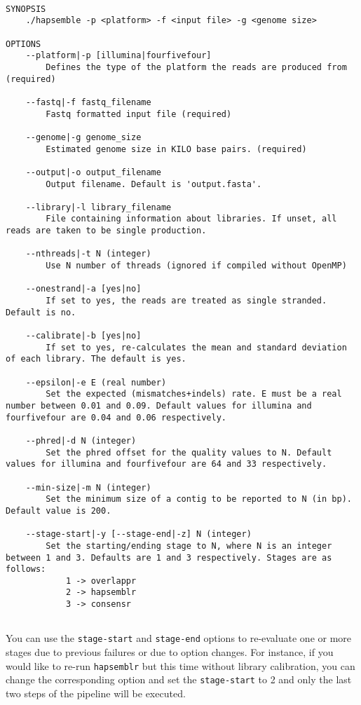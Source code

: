 \documentclass[12pt,a4paper]{report}
\begin{document}
\begin{lstlisting}

SYNOPSIS
    ./hapsemble -p <platform> -f <input file> -g <genome size>

OPTIONS
    --platform|-p [illumina|fourfivefour]
        Defines the type of the platform the reads are produced from (required)
     
    --fastq|-f fastq_filename
        Fastq formatted input file (required)
     
    --genome|-g genome_size
        Estimated genome size in KILO base pairs. (required)
     
    --output|-o output_filename
        Output filename. Default is 'output.fasta'.
     
    --library|-l library_filename
        File containing information about libraries. If unset, all reads are taken to be single production.
     
    --nthreads|-t N (integer)
        Use N number of threads (ignored if compiled without OpenMP)
     
    --onestrand|-a [yes|no]
        If set to yes, the reads are treated as single stranded. Default is no.
     
    --calibrate|-b [yes|no]
        If set to yes, re-calculates the mean and standard deviation of each library. The default is yes.
     
    --epsilon|-e E (real number)
        Set the expected (mismatches+indels) rate. E must be a real number between 0.01 and 0.09. Default values for illumina and fourfivefour are 0.04 and 0.06 respectively.
     
    --phred|-d N (integer)
        Set the phred offset for the quality values to N. Default values for illumina and fourfivefour are 64 and 33 respectively.
     
    --min-size|-m N (integer)
        Set the minimum size of a contig to be reported to N (in bp). Default value is 200.
     
    --stage-start|-y [--stage-end|-z] N (integer)
        Set the starting/ending stage to N, where N is an integer between 1 and 3. Defaults are 1 and 3 respectively. Stages are as follows:
            1 -> overlappr
            2 -> hapsemblr
            3 -> consensr
     
\end{lstlisting}

You can use the \texttt{stage-start} and \texttt{stage-end} options to re-evaluate one or more stages due to previous failures or due to option changes. For instance, if you would like to re-run \texttt{hapsemblr} but this time without library calibration, you can change the corresponding option and set the \texttt{stage-start} to 2 and only the last two steps of the pipeline will be executed. 
\end{document}
